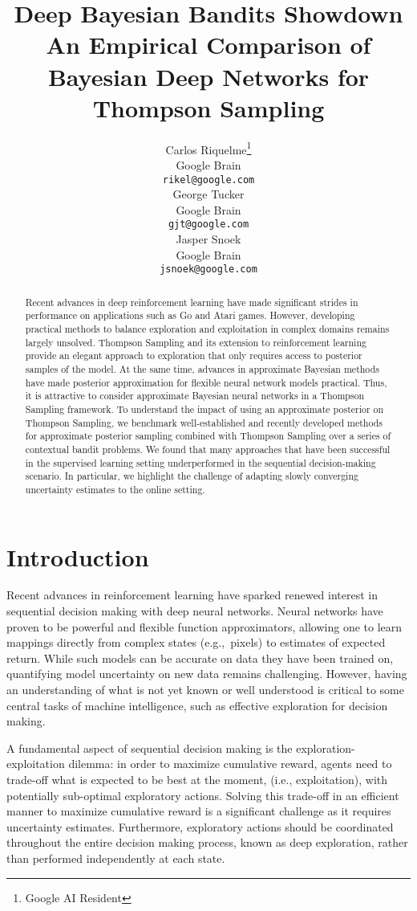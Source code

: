 \documentclass{article} \usepackage{iclr2018_conference,times}
\title{Deep Bayesian Bandits Showdown \\\normalsize An Empirical Comparison of Bayesian Deep Networks for Thompson Sampling}
\author{Carlos Riquelme\thanks{Google AI Resident} \\
Google Brain\\
\texttt{rikel@google.com} \\
\And
George Tucker \\
Google Brain\\
\texttt{gjt@google.com} \\
\And
Jasper Snoek  \\
Google Brain \\
\texttt{jsnoek@google.com}}
\begin{document}
\maketitle
\begin{abstract}
Recent advances in deep reinforcement learning have made significant strides in performance on applications such as Go and Atari games. However, developing practical methods to balance exploration and exploitation in complex domains remains largely unsolved. Thompson Sampling and its extension to reinforcement learning provide an elegant approach to exploration that only requires access to posterior samples of the model. At the same time, advances in approximate Bayesian methods have made posterior approximation for flexible neural network models practical. Thus, it is attractive to consider approximate Bayesian neural networks in a Thompson Sampling framework. To understand the impact of using an approximate posterior on Thompson Sampling, we benchmark well-established and recently developed methods for approximate posterior sampling combined with Thompson Sampling over a series of contextual bandit problems. We found that many approaches that have been successful in the supervised learning setting underperformed in the sequential decision-making scenario. In particular, we highlight the challenge of adapting slowly converging uncertainty estimates to the online setting.
\end{abstract}
 
\section{Introduction}
\label{s:intro}Recent advances in reinforcement learning have sparked renewed interest in sequential decision making with deep neural networks. Neural networks have proven to be powerful and flexible function approximators, allowing one to learn mappings directly from complex states (e.g.,~pixels) to estimates of expected return.  While such models can be accurate on data they have been trained on, quantifying model uncertainty on new data remains challenging.  However, having an understanding of what is not yet known or well understood is critical to some central tasks of machine intelligence, such as effective exploration for decision making.

A fundamental aspect of sequential decision making is the exploration-exploitation dilemma: in order to maximize cumulative reward, agents need to trade-off what is expected to be best at the moment, (i.e., exploitation), with potentially sub-optimal exploratory actions. Solving this trade-off in an efficient manner to maximize cumulative reward is a significant challenge as it requires uncertainty estimates.  Furthermore, exploratory actions should be coordinated throughout the entire decision making process, known as deep exploration, rather than performed independently at each state.
\end{document}
